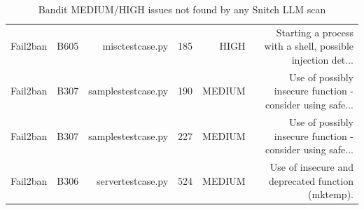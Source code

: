 \begin{table}[htbp]
\begin{tabular}{lrrrrr}
Fail2ban & B605 & misctestcase.py & 185 & HIGH & Starting a process with a shell, possible injection det... \\
Fail2ban & B307 & samplestestcase.py & 190 & MEDIUM & Use of possibly insecure function - consider using safe... \\
Fail2ban & B307 & samplestestcase.py & 227 & MEDIUM & Use of possibly insecure function - consider using safe... \\
Fail2ban & B306 & servertestcase.py & 524 & MEDIUM & Use of insecure and deprecated function (mktemp). \\
\hline
\end{tabular}
\caption{Bandit MEDIUM/HIGH issues not found by any Snitch LLM scan}
\label{tab:missed_bandit}
\end{table}
